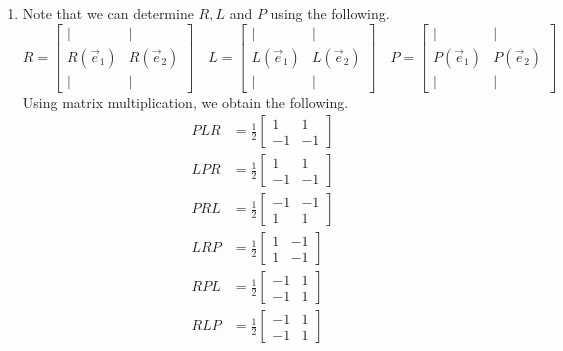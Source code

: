 \begin{SaveQuestion}
\begin{enumerate}
        \item
        Note that we can determine $R, L$ and $P$ using the following.
        $$R = \begin{bmatrix} \vert & \vert \\ R(\vec e_1) & R(\vec e_2) \\ \vert & \vert \end{bmatrix} \quad L = \begin{bmatrix} \vert & \vert \\ L(\vec e_1) & L(\vec e_2) \\ \vert & \vert \end{bmatrix} \quad P = \begin{bmatrix} \vert & \vert \\ P(\vec e_1) & P(\vec e_2) \\ \vert & \vert \end{bmatrix}$$
        Using matrix multiplication, we obtain the following.
        \begin{align*}
            PLR     &= \frac{1}{2}\begin{bmatrix} 1 & 1 \\ -1 & -1 \end{bmatrix} \\
            LPR     &= \frac{1}{2}\begin{bmatrix} 1 & 1 \\ -1 & -1 \end{bmatrix} \\
            PRL     &= \frac{1}{2}\begin{bmatrix} -1 & -1 \\ 1 & 1 \end{bmatrix} \\
            LRP     &= \frac{1}{2}\begin{bmatrix} 1 & -1 \\ 1 & -1 \end{bmatrix} \\ 
            RPL     &= \frac{1}{2}\begin{bmatrix} -1 & 1 \\ -1 & 1 \end{bmatrix} \\
            RLP     &= \frac{1}{2}\begin{bmatrix} -1 & 1 \\ -1 & 1 \end{bmatrix}
        \end{align*}
  \end{enumerate}
\end{SaveQuestion}

